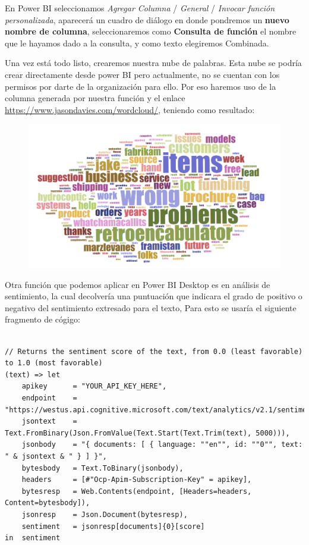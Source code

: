 \documentclass[runningheads]{llncs}
\begin{document}
En Power BI seleccionamos \textit{Agregar Columna} / \textit{General} / \textit{Invocar función personalizada}, aparecerá un cuadro de diálogo en donde pondremos un \textbf{nuevo nombre de columna}, seleccionaremos como \textbf{Consulta de función} el nombre que le hayamos dado a la consulta, y como texto elegiremos Combinada.

Una vez está todo listo, crearemos nuestra nube de palabras. Esta nube se podría crear directamente desde power BI pero actualmente, no se cuentan con los permisos por darte de la organización para ello. Por eso haremos uso de la columna generada por nuestra función y el enlace \url{https://www.jasondavies.com/wordcloud/}, teniendo como resultado: 

\begin{figure}[H]
\centering
\includegraphics[scale=0.5]{./IA/AZURE/wordcloud.png}
\end{figure}
Otra función que podemos aplicar en Power BI Desktop es en análisis de sentimiento, la cual decolvería una puntuación que indicara el grado de positivo o negativo del sentimiento extresado para el texto, Para esto se usaría el siguiente fragmento de cógigo:

\small{
\begin{verbatim}

// Returns the sentiment score of the text, from 0.0 (least favorable) to 1.0 (most favorable)
(text) => let
    apikey      = "YOUR_API_KEY_HERE",
    endpoint    = "https://westus.api.cognitive.microsoft.com/text/analytics/v2.1/sentiment",
    jsontext    = Text.FromBinary(Json.FromValue(Text.Start(Text.Trim(text), 5000))),
    jsonbody    = "{ documents: [ { language: ""en"", id: ""0"", text: " & jsontext & " } ] }",
    bytesbody   = Text.ToBinary(jsonbody),
    headers     = [#"Ocp-Apim-Subscription-Key" = apikey],
    bytesresp   = Web.Contents(endpoint, [Headers=headers, Content=bytesbody]),
    jsonresp    = Json.Document(bytesresp),
    sentiment   = jsonresp[documents]{0}[score]
in  sentiment
\end{verbatim}
}
\end{document}
